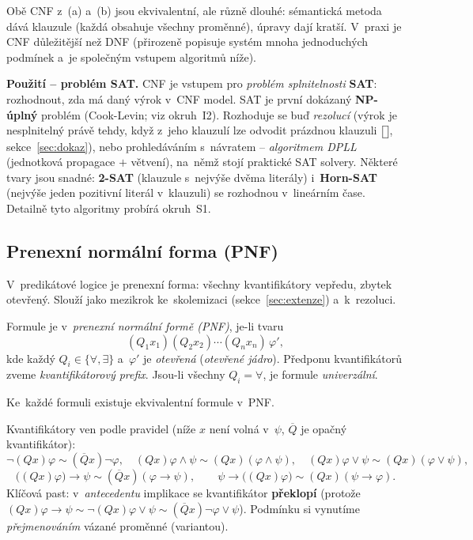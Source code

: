 \documentclass[11pt,a4paper]{article}
\newcommand{\eclause}{\mathord{\text{\framebox[1.25ex][c]{\rule{0pt}{0.95ex}}}}}
\begin{document}
\begin{poznamka}
Obě CNF z~(a) a~(b) jsou ekvivalentní, ale různě dlouhé: sémantická metoda dává  klauzule (každá obsahuje všechny proměnné), úpravy dají kratší. V~praxi je CNF důležitější než DNF (přirozeně popisuje systém mnoha jednoduchých podmínek a~je společným vstupem algoritmů níže).
\end{poznamka}

\begin{poznamka}
\textbf{Použití -- problém SAT.} CNF je vstupem pro \emph{problém splnitelnosti} \textbf{SAT}: rozhodnout, zda má daný výrok v~CNF model. SAT je první dokázaný \textbf{NP-úplný} problém (Cook-Levin; viz okruh~I2). Rozhoduje se buď \emph{rezolucí} (výrok je nesplnitelný právě tehdy, když z~jeho klauzulí lze odvodit prázdnou klauzuli~$\eclause$, sekce~\ref{sec:dokaz}), nebo prohledáváním s~návratem -- \emph{algoritmem DPLL} (jednotková propagace $+$ větvení), na~němž stojí praktické SAT solvery. Některé tvary jsou snadné: \textbf{2-SAT} (klauzule s~nejvýše dvěma literály) i~\textbf{Horn-SAT} (nejvýše jeden pozitivní literál v~klauzuli) se rozhodnou v~lineárním čase. Detailně tyto algoritmy probírá okruh~S1.
\end{poznamka}

\subsection{Prenexní normální forma (PNF)}

V~predikátové logice je  prenexní forma: všechny kvantifikátory vepředu, zbytek otevřený. Slouží jako mezikrok ke~skolemizaci (sekce~\ref{sec:extenze}) a~k~rezoluci.

\begin{definice}
Formule je v~\emph{prenexní normální formě (PNF)}, je-li tvaru
\[
(Q_1x_1)(Q_2x_2)\cdots(Q_nx_n)\,\varphi',
\]
kde každý $Q_i\in\{\forall,\exists\}$ a~$\varphi'$ je \emph{otevřená} (\emph{otevřené jádro}). Předponu kvantifikátorů zveme \emph{kvantifikátorový prefix}. Jsou-li všechny $Q_i=\forall$, je formule \emph{univerzální}.
\end{definice}

\begin{veta}
Ke~každé formuli existuje ekvivalentní formule v~PNF.
\end{veta}

\begin{intuice}
Kvantifikátory  ven podle pravidel (níže $x$ není volná v~$\psi$, $\overline{Q}$ je opačný kvantifikátor):
\[
\neg(Qx)\varphi\sim(\overline{Q}x)\neg\varphi,\quad
(Qx)\varphi\wedge\psi\sim(Qx)(\varphi\wedge\psi),\quad
(Qx)\varphi\vee\psi\sim(Qx)(\varphi\vee\psi),
\]
\[
\big((Qx)\varphi\big)\to\psi\sim(\overline{Q}x)(\varphi\to\psi),\qquad
\psi\to\big((Qx)\varphi\big)\sim(Qx)(\psi\to\varphi).
\]
Klíčová past: v~\emph{antecedentu} implikace se kvantifikátor \textbf{překlopí} (protože $(Qx)\varphi\to\psi\sim\neg(Qx)\varphi\vee\psi\sim(\overline Qx)\neg\varphi\vee\psi$). Podmínku  si vynutíme \emph{přejmenováním} vázané proměnné (variantou).
\end{intuice}
\end{document}
